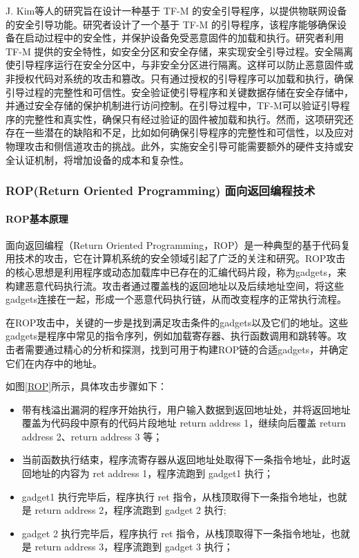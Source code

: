 \documentclass[12pt,a4paper]{ctexart}
\numberwithin{figure}{section}
\begin{document}
\par J. Kim等人的研究\cite{secure-bootloader}旨在设计一种基于 TF-M 的安全引导程序，以提供物联网设备的安全引导功能。研究者设计了一个基于 TF-M 的引导程序，该程序能够确保设备在启动过程中的安全性，并保护设备免受恶意固件的加载和执行。研究者利用 TF-M 提供的安全特性，如安全分区和安全存储，来实现安全引导过程。安全隔离使引导程序运行在安全分区中，与非安全分区进行隔离。这样可以防止恶意固件或非授权代码对系统的攻击和篡改。只有通过授权的引导程序可以加载和执行，确保引导过程的完整性和可信性。安全验证使引导程序和关键数据存储在安全存储中，并通过安全存储的保护机制进行访问控制。在引导过程中，TF-M可以验证引导程序的完整性和真实性，确保只有经过验证的固件被加载和执行。然而，这项研究还存在一些潜在的缺陷和不足，比如如何确保引导程序的完整性和可信性，以及应对物理攻击和侧信道攻击的挑战。此外，实施安全引导可能需要额外的硬件支持或安全认证机制，将增加设备的成本和复杂性。


\subsubsection{ROP(Return Oriented Programming) 面向返回编程技术}
\paragraph{ROP基本原理}
\par 面向返回编程（Return Oriented Programming，ROP）是一种典型的基于代码复用技术的攻击，它在计算机系统的安全领域引起了广泛的关注和研究。ROP攻击的核心思想是利用程序或动态加载库中已存在的汇编代码片段，称为gadgets，来构建恶意代码执行流。攻击者通过覆盖栈的返回地址以及后续地址空间，将这些gadgets连接在一起，形成一个恶意代码执行链，从而改变程序的正常执行流程。
\par 在ROP攻击中，关键的一步是找到满足攻击条件的gadgets以及它们的地址。这些gadgets是程序中常见的指令序列，例如加载寄存器、执行函数调用和跳转等。攻击者需要通过精心的分析和探测，找到可用于构建ROP链的合适gadgets，并确定它们在内存中的地址。
\par 如图\ref{ROP}所示，具体攻击步骤如下：
\begin{itemize}
    \item 带有栈溢出漏洞的程序开始执行，用户输入数据到返回地址处，并将返回地址覆盖为代码段中原有的代码片段地址 return address 1，继续向后覆盖 return address 2、return address 3 等；
    \item 当前函数执行结束，程序流寄存器从返回地址处取得下一条指令地址，此时返回地址的内容为 ret address 1，程序流跑到 gadget1 执行；
    \item gadget1 执行完毕后，程序执行 ret 指令，从栈顶取得下一条指令地址，也就是 return address 2，程序流跑到 gadget 2 执行;
    \item gadget 2 执行完毕后，程序执行 ret 指令，从栈顶取得下一条指令地址，也就是 return address 3，程序流跑到 gadget 3 执行；
\end{itemize}
\end{document}
